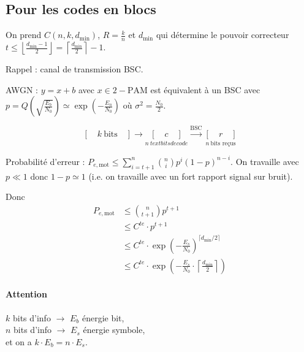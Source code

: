 \subsection{Pour les codes en blocs}

	On prend $C(n,k,d_{\min})$, $R = \frac{k}{n}$ et $d_{\min}$ qui détermine le pouvoir correcteur $t \leq \left\lfloor \frac{d_{\min} - 1}{2} \right\rfloor = \left\lceil \frac{d_{\min}}{2} \right\rceil - 1$.

	Rappel : canal de transmission BSC.\\

	AWGN : $y = x + b$ avec $x \in 2-\text{PAM}$ est équivalent à un BSC avec $p = Q \left( \sqrt{\frac{E_b}{N_0}} \right) \simeq  \exp \left( - \frac{E_n}{N_0} \right)$ où $\sigma^2 = \frac{N_0}{2}$.
	
	$$[ \quad k\ \text{bits} \quad ] \longrightarrow \underset{n\ text{bits de code}}{[ \quad c \quad ]} \overset{\text{BSC}}{\longrightarrow} \underset{n\ \text{bits reçus}}{[ \quad r \quad ]}$$
	
	Probabilité d'erreur : $P_{e,\text{mot}} \leq \sum_{i = t + 1}^{n} \binom{n}{i} p^i (1 - p)^{n - i}$.
	On travaille avec $p \ll 1$ donc $1 - p \simeq 1$ (i.e. on travaille avec un fort rapport signal sur bruit).
	
	Donc
	\begin{align*}
	P_{e,\text{mot}}
	& \leq \binom{n}{t + 1} p^{t + 1}\\
	& \leq C^{te} \cdot p^{t + 1}\\
	& \leq C^{te} \cdot \exp \left( - \frac{E_s}{N_0} \right)^{\lceil d_{\min}/2 \rceil}\\
	& \leq C^{te} \cdot \exp \left( - \frac{E_s}{N_0} \cdot \left\lceil \frac{d_{\min}}{2} \right\rceil \right)
	\end{align*}

	\paragraph{Attention}
		$k$ bits d'info $\longrightarrow$ $E_b$ énergie bit,\\
		$n$ bits d'info $\longrightarrow$ $E_s$ énergie symbole,\\
		et on a $k \cdot E_b = n \cdot E_s$.

